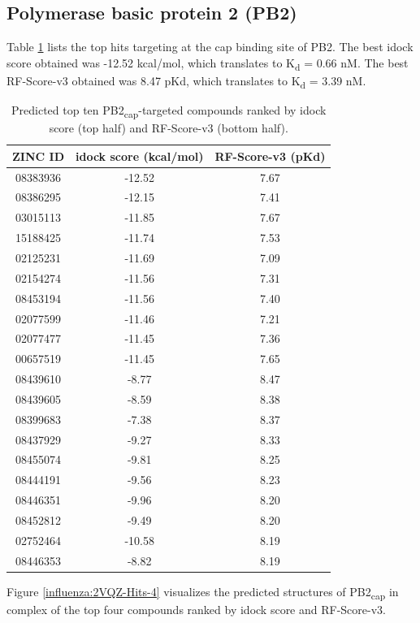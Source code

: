 \subsection{Polymerase basic protein 2 (PB2)}

Table \ref{influenza:2VQZ-Hits-10} lists the top hits targeting at the cap binding site of PB2. The best idock score obtained was -12.52 kcal/mol, which translates to K\textsubscript{d} = 0.66 nM. The best RF-Score-v3 obtained was 8.47 pKd, which translates to K\textsubscript{d} = 3.39 nM.

\begin{table}
\caption{Predicted top ten PB2\textsubscript{cap}-targeted compounds ranked by idock score (top half) and RF-Score-v3 (bottom half).}
\label{influenza:2VQZ-Hits-10}
\begin{tabular}{ccc}
\hline
ZINC ID & idock score (kcal/mol) & RF-Score-v3 (pKd)\\
\hline
08383936 & -12.52 & 7.67\\
08386295 & -12.15 & 7.41\\
03015113 & -11.85 & 7.67\\
15188425 & -11.74 & 7.53\\
02125231 & -11.69 & 7.09\\
02154274 & -11.56 & 7.31\\
08453194 & -11.56 & 7.40\\
02077599 & -11.46 & 7.21\\
02077477 & -11.45 & 7.36\\
00657519 & -11.45 & 7.65\\
\hline
08439610 &  -8.77 & 8.47\\
08439605 &  -8.59 & 8.38\\
08399683 &  -7.38 & 8.37\\
08437929 &  -9.27 & 8.33\\
08455074 &  -9.81 & 8.25\\
08444191 &  -9.56 & 8.23\\
08446351 &  -9.96 & 8.20\\
08452812 &  -9.49 & 8.20\\
02752464 & -10.58 & 8.19\\
08446353 &  -8.82 & 8.19\\
\hline
\end{tabular}
\end{table}

Figure \ref{influenza:2VQZ-Hits-4} visualizes the predicted structures of PB2\textsubscript{cap} in complex of the top four compounds ranked by idock score and RF-Score-v3.

